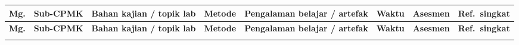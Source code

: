 \documentclass[12pt,a4paper]{article}
\begin{document}
{\footnotesize
\setlength{\tabcolsep}{3pt}%
\begin{longtable}{|>{\raggedright\arraybackslash}p{0.55cm}|>{\raggedright\arraybackslash}p{1.35cm}|>{\raggedright\arraybackslash}p{2.05cm}|>{\raggedright\arraybackslash}p{1.75cm}|>{\raggedright\arraybackslash}p{2.15cm}|>{\raggedright\arraybackslash}p{0.85cm}|>{\raggedright\arraybackslash}p{1.45cm}|>{\raggedright\arraybackslash}p{2.05cm}|}
\hline
\textbf{Mg.} & \textbf{Sub-CPMK} & \textbf{Bahan kajian / topik lab} & \textbf{Metode} & \textbf{Pengalaman belajar / artefak} & \textbf{Waktu} & \textbf{Asesmen} & \textbf{Ref.\ singkat} \\
\hline
\endfirsthead
\hline
\textbf{Mg.} & \textbf{Sub-CPMK} & \textbf{Bahan kajian / topik lab} & \textbf{Metode} & \textbf{Pengalaman belajar / artefak} & \textbf{Waktu} & \textbf{Asesmen} & \textbf{Ref.\ singkat} \\
\hline
\endhead
\hline
\endfoot


\end{longtable}}
\end{document}

